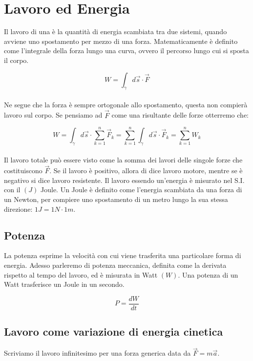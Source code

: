 \section{Lavoro ed Energia}
Il lavoro di una è la quantità di energia scambiata tra due sistemi,
quando avviene uno spostamento per mezzo di una forza. Matematicamente è
definito come l'integrale della forza lungo una curva, ovvero il percorso
lungo cui si sposta il corpo.

\begin{equation}
    \boxed{W = \int_\gamma d\vec s \cdot \vec F}
\label{eq:work&energy:work_def}
\end{equation}
\\
Ne segue che la forza è sempre ortogonale allo spostamento, questa non
compierà lavoro sul corpo. Se pensiamo ad $\vec F$ come una risultante
delle forze otterremo che:

\begin{equation}
    W =  \int_\gamma d\vec s \cdot \sum_{k=1}^n\vec F_k =
    \sum_{k=1}^n \int_\gamma d\vec s \cdot \vec F_k = \sum_{k=1}^n W_k
\label{eq:work&energy:work_sum}
\end{equation}
\\
Il lavoro totale può essere visto come la somma dei lavori delle singole
forze che costituiscono $\vec F$.
Se il lavoro è positivo, allora di dice lavoro motore, mentre se è negativo
si dice lavoro resistente.
Il lavoro essendo un'energia è misurato nel S.I. con il $(J)$ Joule.
Un Joule è definito come l'energia scambiata da una forza di un Newton, per
compiere uno spostamento di un metro lungo la sua stessa direzione:
$1J = 1N\cdot 1 m$.

\subsection{Potenza}
La potenza esprime la velocità con cui viene trasferita una particolare forma
di energia. Adesso parleremo di potenza meccanica, definita come la derivata
rispetto al tempo del lavoro, ed è misurata in Watt $(W)$.
Una potenza di un Watt trasferisce un Joule in un secondo.

\begin{equation}
    \boxed{P=\frac{dW}{dt}}
\label{eq:work&energy:power_def}
\end{equation}

\subsection{Lavoro come variazione di energia cinetica}
Scriviamo il lavoro infinitesimo per una forza generica data da
$\vec F = m\vec a$.

